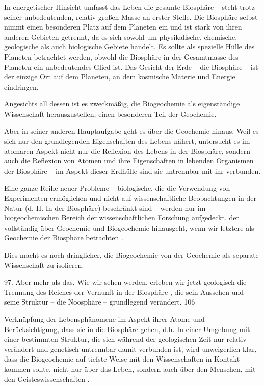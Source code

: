 \documentclass[11pt,a4paper]{book}
\begin{document}
In energetischer Hinsicht umfasst das Leben die gesamte Biosphäre -- steht trotz seiner unbedeutenden, relativ großen Masse an erster Stelle. Die Biosphäre selbst nimmt einen besonderen Platz auf dem Planeten ein und ist stark von ihren anderen Gebieten getrennt, da es sich sowohl um physikalische, chemische, geologische als auch biologische Gebiete handelt. Es sollte als spezielle Hülle des Planeten betrachtet werden, obwohl die Biosphäre in der Gesamtmasse des Planeten ein unbedeutendes Glied ist. Das Gesicht der Erde -- die Biosphäre -- ist der einzige Ort auf dem Planeten, an dem kosmische Materie und Energie eindringen.



Angesichts all dessen ist es zweckmäßig, die Biogeochemie als eigenständige Wissenschaft herauszustellen, einen besonderen Teil der Geochemie.



Aber in seiner anderen Hauptaufgabe geht es über die Geochemie hinaus. Weil es sich nur den grundlegenden Eigenschaften des Lebens nähert, untersucht es im atomaren Aspekt nicht nur die Reflexion des Lebens in der Biosphäre, sondern auch die Reflexion von Atomen und ihre Eigenschaften in lebenden Organismen der Biosphäre -- im Aspekt dieser Erdhülle sind sie untrennbar mit ihr verbunden.



Eine ganze Reihe neuer Probleme -- biologische, die die Verwendung von Experimenten ermöglichen und nicht auf wissenschaftliche Beobachtungen in der Natur (d. H. In der Biosphäre) beschränkt sind -- werden nur im biogeochemischen Bereich der wissenschaftlichen Forschung aufgedeckt, der vollständig über Geochemie und Biogeochemie hinausgeht, wenn wir letztere als Geochemie der Biosphäre betrachten .



Dies macht es noch dringlicher, die Biogeochemie von der Geochemie als separate Wissenschaft zu isolieren.



97. Aber mehr als das. Wie wir sehen werden, erleben wir jetzt geologisch die Trennung des Reiches der Vernunft in der Biosphäre , die sein Aussehen und seine Struktur -- die Noosphäre -- grundlegend verändert. 106



Verknüpfung der Lebensphänomene im Aspekt ihrer Atome und Berücksichtigung, dass sie in die Biosphäre gehen, d.h. In einer Umgebung mit einer bestimmten Struktur, die sich während der geologischen Zeit nur relativ verändert und genetisch untrennbar damit verbunden ist, wird unweigerlich klar, dass die Biogeochemie auf tiefste Weise mit den Wissenschaften in Kontakt kommen sollte, nicht nur über das Leben, sondern auch über den Menschen, mit den Geisteswissenschaften .
\end{document}
